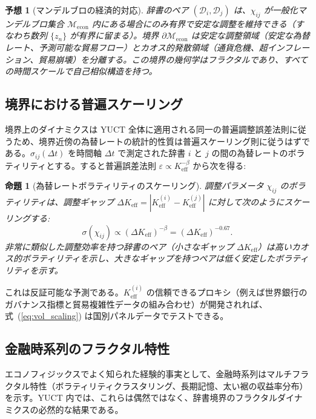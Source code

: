\documentclass[12pt,a4paper]{article}
\newtheorem{proposition}[theorem]{命題}
\newtheorem{conjecture}[theorem]{予想}
\theoremstyle{remark}
\begin{document}
	\begin{conjecture}[マンデルブロの経済的対応]
		辞書のペア \((\mathcal{D}_i, \mathcal{D}_j)\) は、\(\chi_{ij}\) が一般化マンデルブロ集合 \(\mathcal{M}_{\mathrm{econ}}\) 内にある場合にのみ有界で安定な調整を維持できる（すなわち数列 \(\{z_n\}\) が有界に留まる）。境界 \(\partial\mathcal{M}_{\mathrm{econ}}\) は安定な調整領域（安定な為替レート、予測可能な貿易フロー）とカオス的発散領域（通貨危機、超インフレーション、貿易崩壊）を分離する。この境界の幾何学はフラクタルであり、すべての時間スケールで自己相似構造を持つ。
	\end{conjecture}
	
	\subsection{境界における普遍スケーリング}
	
	境界上のダイナミクスは YUCT 全体に適用される同一の普遍調整誤差法則に従うため、境界近傍の為替レートの統計的性質は普遍スケーリング則に従うはずである。\(\sigma_{ij}(\Delta t)\) を時間軸 \(\Delta t\) で測定された辞書 \(i\) と \(j\) の間の為替レートのボラティリティとする。すると普遍誤差法則 \(\varepsilon \propto K_{\mathrm{eff}}^{-\beta}\) から次を得る:
	
	\begin{proposition}[為替レートボラティリティのスケーリング]
		調整パラメータ \(\chi_{ij}\) のボラティリティは、調整ギャップ \(\Delta K_{\mathrm{eff}} = |K_{\mathrm{eff}}^{(i)} - K_{\mathrm{eff}}^{(j)}|\) に対して次のようにスケーリングする:
		\begin{equation}
			\sigma(\chi_{ij}) \propto (\Delta K_{\mathrm{eff}})^{-\beta} = (\Delta K_{\mathrm{eff}})^{-0.67}.
			\label{eq:vol_scaling}
		\end{equation}
		非常に類似した調整効率を持つ辞書のペア（小さなギャップ \(\Delta K_{\mathrm{eff}}\)）は高いカオス的ボラティリティを示し、大きなギャップを持つペアは低く安定したボラティリティを示す。
	\end{proposition}
	
	これは反証可能な予測である。\(K_{\mathrm{eff}}^{(i)}\) の信頼できるプロキシ（例えば世界銀行のガバナンス指標と貿易複雑性データの組み合わせ）が開発されれば、式~(\ref{eq:vol_scaling}) は国別パネルデータでテストできる。
	
	\subsection{金融時系列のフラクタル特性}
	エコノフィジックスでよく知られた経験的事実として、金融時系列はマルチフラクタル特性（ボラティリティクラスタリング、長期記憶、太い裾の収益率分布）を示す。YUCT 内では、これらは偶然ではなく、辞書境界のフラクタルダイナミクスの必然的な結果である。
	
\end{document}
